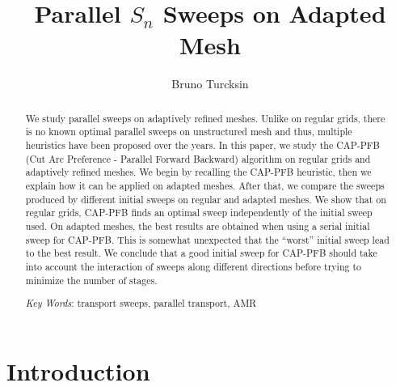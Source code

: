 \documentclass{mc2015}
\renewcommand{\(}{\left(}
\renewcommand{\)}{\right)}
\renewcommand{\[}{\left[}
\renewcommand{\]}{\right]}
\begin{document}
\title{Parallel $S_n$ Sweeps on Adapted Mesh}
\author{Bruno Turcksin} 

\maketitle

\begin{abstract}
  We study parallel sweeps on adaptively refined meshes. Unlike on regular
  grids, there is no known optimal parallel sweeps on unstructured mesh and
  thus, multiple heuristics have been proposed over the years. In this paper, we
  study the CAP-PFB (Cut Arc Preference - Parallel Forward Backward) algorithm
  on regular grids and adaptively refined meshes. We begin by recalling the
  CAP-PFB heuristic, then we explain how it can be applied on adapted meshes.
  After that, we compare the sweeps produced by different initial sweeps on
  regular and adapted meshes. We show that on regular grids, CAP-PFB finds an
  optimal sweep independently of the initial sweep used. On adapted meshes, the
  best results are obtained when using a serial initial sweep for CAP-PFB. This
  is somewhat unexpected that the ``worst'' initial sweep lead to the best
  result. We conclude that a good initial sweep for CAP-PFB should take into
  account the interaction of sweeps along different directions before trying to
  minimize the number of stages.

  \emph{Key Words}: transport sweeps, parallel transport, AMR
\end{abstract}

\section{Introduction}
\end{document}
